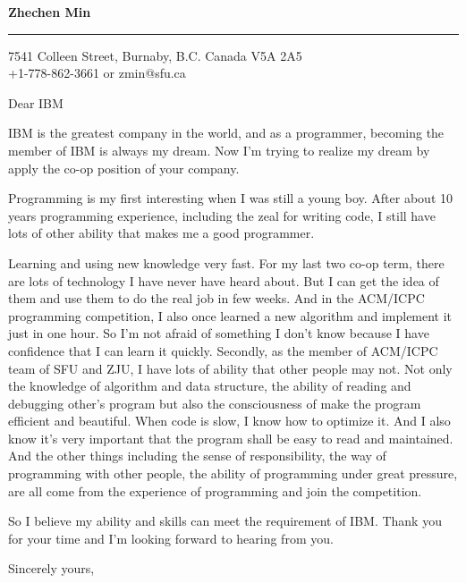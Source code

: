 \documentclass{letter} %
\begin{document}
\signature{Zhechen Min}           %
\longindentation=0pt                       %
\let\raggedleft\raggedright                %
 
 
\begin{letter}{}


\begin{flushleft}
{\large\bf Zhechen Min}
\end{flushleft}
\medskip\hrule height 1pt
\begin{flushright}
\hfill 7541 Colleen Street, Burnaby, B.C. Canada V5A 2A5 \\
\hfill +1-778-862-3661 or zmin@sfu.ca
\end{flushright} 
\vfill %

 
\opening{Dear IBM} 
 
\noindent IBM is the greatest company in the world, and as a programmer, becoming the member of IBM is always my dream. Now I'm trying to realize my dream by apply the co-op position of your company.

\noindent Programming is my first interesting when I was still a young boy. After about 10 years programming experience, including the zeal for writing code, I still have lots of other ability that makes me a good programmer. 

\noindent Learning and using new knowledge very fast. For my last two co-op term, there are lots of technology I have never have heard about. But I can get the idea of them and use them to do the real job in few weeks. And in the ACM/ICPC programming competition, I also once learned a new algorithm and implement it just in one hour. So I'm not afraid of something I don't know because I have confidence that I can learn it quickly. Secondly, as the member of ACM/ICPC team of SFU and ZJU, I have lots of ability that other people may not. Not only the knowledge of algorithm and data structure, the ability of reading and debugging other's program but also the consciousness of make the program efficient and beautiful. When code is slow, I know how to optimize it. And I also know it's very
important that the program shall be easy to read and maintained. And the other things including the sense of responsibility, the way of programming with other people, the ability of programming under great pressure, are all come from the experience of programming and join the competition.

\noindent So I believe my ability and skills can meet the requirement of IBM. Thank you for your time and I'm looking forward to hearing from you. 

\closing{Sincerely yours,} 
 

 

\end{letter}
 
\end{document}
